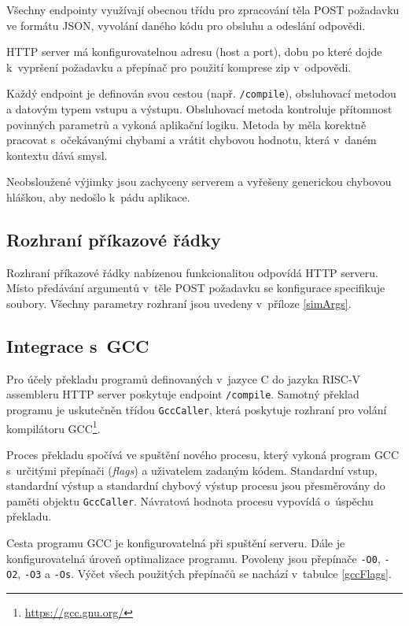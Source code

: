 Všechny endpointy využívají obecnou třídu pro zpracování těla POST požadavku ve formátu JSON, vyvolání daného kódu pro obsluhu a odeslání odpovědi.

HTTP server má konfigurovatelnou adresu (host a port), dobu po které dojde k~vypršení požadavku a přepínač pro použití komprese zip v~odpovědi.

Každý endpoint je definován svou cestou (např. \texttt{/compile}), obsluhovací metodou a datovým typem vstupu a výstupu.
Obsluhovací metoda kontroluje přítomnost povinných parametrů a vykoná aplikační logiku.
Metoda by měla korektně pracovat s~očekávanými chybami a vrátit chybovou hodnotu, která v~daném kontextu dává smysl. 

Neobsloužené výjimky jsou zachyceny serverem a vyřešeny generickou chybovou hláškou, aby nedošlo k~pádu aplikace. 

\subsection{Rozhraní příkazové řádky}

Rozhraní příkazové řádky nabízenou funkcionalitou odpovídá HTTP serveru.
Místo předávání argumentů v~těle POST požadavku se konfigurace specifikuje soubory.
Všechny parametry rozhraní jsou uvedeny v~příloze \ref{simArgs}.

\subsection{Integrace s~GCC}

Pro účely překladu programů definovaných v~jazyce C do jazyka RISC-V assembleru HTTP server poskytuje endpoint \texttt{/compile}.
Samotný překlad programu je uskutečněn třídou \texttt{GccCaller}, která poskytuje rozhraní pro volání kompilátoru GCC\footnote{\url{https://gcc.gnu.org/}}.

Proces překladu spočívá ve spuštění nového procesu, který vykoná program GCC s~určitými přepínači (\emph{flags}) a uživatelem zadaným kódem.
Standardní vstup, standardní výstup a standardní chybový výstup procesu jsou přesměrovány do paměti objektu \texttt{GccCaller}.
Návratová hodnota procesu vypovídá o~úspěchu překladu.

Cesta programu GCC je konfigurovatelná při spuštění serveru.
Dále je konfigurovatelná úroveň optimalizace programu.
Povoleny jsou přepínače \texttt{-O0}, \texttt{-O2}, \texttt{-O3} a \texttt{-Os}.
Výčet všech použitých přepínačů se nachází v~tabulce \ref{gccFlags}.

